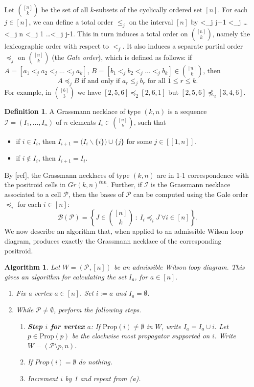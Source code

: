 \documentclass[11pt]{article}
\def\bas #1\eas{\begin{align*} #1 \end{align*}}
\newcommand{\cP}{\mathcal{P}}
\newcommand{\Prop}{\textrm{Prop}}
\newcommand{\II}{\mathcal{I}}
\newcommand{\PP}{\mathcal{P}}
\newcommand{\BB}{\mathcal{B}}
\newcommand{\interval}[2]{[\![#1,#2]\!]}
\newcommand{\gale}[1]{\preccurlyeq_{#1}}
\newtheorem{algorithm}[thm]{Algorithm}
\theoremstyle{remark}
\theoremstyle{definition}
\newtheorem{dfn}[thm]{Definition}
\begin{document}
Let $\binom{[n]}{k}$ be the set of all $k$-subsets of the cyclically ordered set $[n]$.  For each $j \in [n]$, we can define a total order $\leq_j$ on the interval $[n]$ by
\bas j <_j j+1 <_j \dots <_j n <_j 1 \dots <_j j-1\;.\eas
This in turn induces a total order on $\binom{[n]}{k}$, namely the lexicographic order with respect to $<_j$.  It also induces a separate partial order $\gale{j}$ on $\binom{[n]}{k}$ (the \textit{Gale order}), which is defined as follows: if $A = [a_1 <_j a_2 <_j \dots <_j a_k]$,  $B = [b_1 <_j b_2 <_j \dots <_j b_k] \in \binom{[n]}{k}$, then
\[A \gale{j} B \text{ if and only if } a_r \leq_j b_r \text{ for all }1 \leq r \leq k.\]
For example, in $\binom{[6]}{3}$ we have $[2,5,6]\gale{2} [2,6,1]$ but $[2,5,6]\not\gale{2}[3,4,6]$.


\begin{dfn}\label{def:grassmann necklace}
A Grassmann necklace of type $(k,n)$ is a sequence $\II = (I_1, \dots, I_n)$ of $n$ elements $I_i \in \binom{[n]}{k}$, such that
\begin{itemize}
\item if $i \in I_i$, then $I_{i+1} = \big(I_i \backslash \{i\}\big) \cup \{j\}$ for some $j \in \interval{1}{n}$.
\item if $i \not\in I_i$, then $I_{i+1} = I_i$.
\end{itemize}
\end{dfn}

By [ref], the Grassmann necklaces of type $(k,n)$ are in 1-1 correspondence with the positroid cells in $Gr(k,n)^{tnn}$.  Further, if $\II$ is the Grassmann necklace associated to a cell $\PP$, then the bases of $\PP$ can be computed using the Gale order $\gale{i}$ for each $i \in [n]$:
\[\BB(\PP) = \left\{J \in \binom{[n]}{k}\ :\ I_i \gale{i} J \ \forall i \in [n]\right\}.\]
We now describe an algorithm that, when applied to an admissible Wilson loop diagram, produces exactly the Grassmann necklace of the corresponding positroid.

\begin{algorithm}\label{alg:put GN on WLD}
Let $W = (\cP, [n])$ be an admissible Wilson loop diagram. This gives an algorithm for calculating the set $I_a$, for $a \in [n]$.

\begin{enumerate}
\item Fix a vertex $a \in [n]$. Set $i:=a$ and $I_a = \emptyset$.
\item While $\cP \neq \emptyset$, perform the following steps.
\begin{enumerate}
\item \textbf{Step $i$ for vertex $a$}: If $\Prop(i) \neq \emptyset$ in $W$, write $I_a = I_a \cup i$. Let $p \in \Prop(p)$ be the clockwise most propagator supported on $i$. Write $W = (\cP \setminus p, n)$.
\item If $Prop(i) = \emptyset$ do nothing.
\item Increment $i$ by 1 and repeat from (a).
\end{enumerate}
\end{enumerate}
\end{algorithm}
\end{document}
